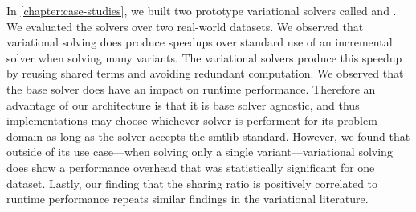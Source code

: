 In \autoref{chapter:case-studies}, we built two prototype variational solvers
called \vsat{} and \vsmt{}. We evaluated the solvers over two real-world
datasets. We observed that variational solving does produce speedups over
standard use of an incremental solver when solving many variants. The
variational solvers produce this speedup by reusing shared terms and avoiding
redundant computation. We observed that the base solver does have an impact on
runtime performance. Therefore an advantage of our architecture is that it is
base solver agnostic, and thus implementations may choose whichever solver is
performent for its problem domain as long as the solver accepts the \acl{smtlib}
standard. However, we found that outside of its use case---when solving only a
single variant---variational solving does show a performance overhead that was
statistically significant for one dataset. Lastly, our finding that the sharing
ratio is positively correlated to runtime performance repeats similar findings
in the variational literature.
